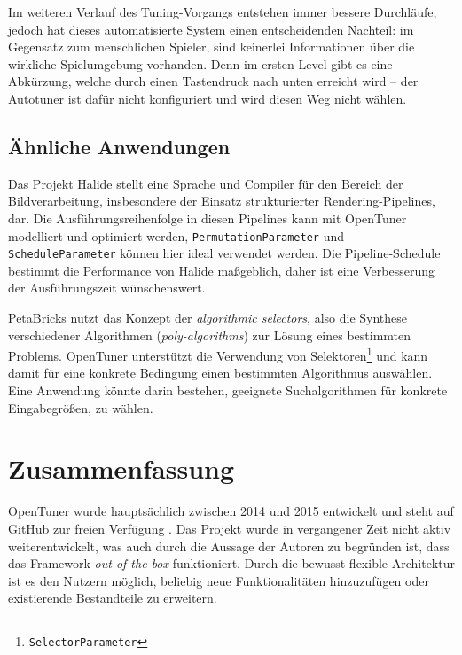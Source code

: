\documentclass[a4paper,11pt]{scrartcl}
\begin{document}
Im weiteren Verlauf des Tuning-Vorgangs entstehen immer bessere Durchläufe, jedoch
hat dieses automatisierte System einen entscheidenden Nachteil: im Gegensatz zum menschlichen
Spieler, sind keinerlei Informationen über die wirkliche Spielumgebung vorhanden.
Denn im ersten Level gibt es eine Abkürzung, welche durch einen Tastendruck nach 
unten erreicht wird -- der Autotuner ist dafür nicht konfiguriert und wird diesen Weg
nicht wählen.


\subsection{Ähnliche Anwendungen}
Das Projekt Halide \cite{halide} stellt eine Sprache und Compiler für den Bereich der 
Bildverarbeitung, insbesondere der Einsatz strukturierter Rendering-Pipelines, dar.
Die Ausführungsreihenfolge in diesen Pipelines kann mit OpenTuner modelliert und 
optimiert werden, \texttt{PermutationParameter} und \texttt{ScheduleParameter}
können hier ideal verwendet werden. Die Pipeline-Schedule bestimmt die Performance
von Halide maßgeblich, daher ist eine Verbesserung der Ausführungszeit wünschenswert. \newline

PetaBricks \cite{petab} nutzt das Konzept der \emph{algorithmic selectors}, also die 
Synthese verschiedener Algorithmen (\emph{poly-algorithms}) zur Lösung eines bestimmten Problems.
OpenTuner unterstützt die Verwendung von Selektoren\footnote{\texttt{SelectorParameter}}
und kann damit für eine konkrete Bedingung einen bestimmten Algorithmus auswählen. 
Eine Anwendung könnte darin bestehen, geeignete Suchalgorithmen für konkrete
Eingabegrößen, zu wählen.



\section{Zusammenfassung}
OpenTuner wurde hauptsächlich zwischen 2014 und 2015 entwickelt und steht auf GitHub 
zur freien Verfügung \cite{ghub}. Das Projekt wurde in vergangener Zeit nicht aktiv
weiterentwickelt, was auch durch die Aussage der Autoren zu begründen ist, dass das
Framework \emph{out-of-the-box} funktioniert. Durch die bewusst flexible Architektur
ist es den Nutzern möglich, beliebig neue Funktionalitäten hinzuzufügen oder 
existierende Bestandteile zu erweitern. \newline
\end{document}
